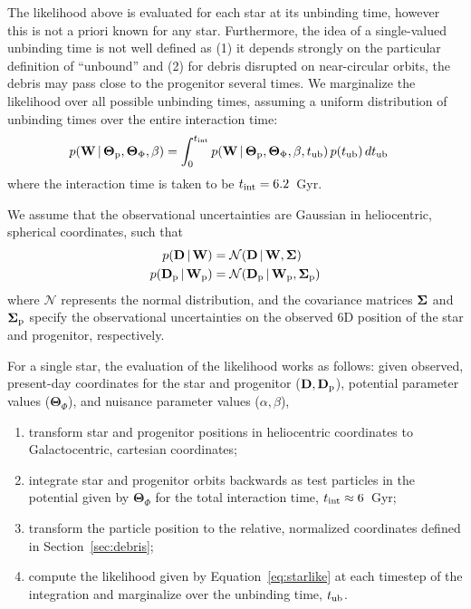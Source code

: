 \documentclass[letterpaper,12pt,preprint]{aastex}
\newcommand{\given}{\,|\,}
\newcommand{\D}{{\bf D}}
\newcommand{\W}{{\bf W}}
\newcommand{\bSigma}{{\bf \Sigma}}
\newcommand{\bs}{\boldsymbol}
\newcommand{\sat}{{\rm p}}
\newcommand{\tub}{t_{\rm ub}}
\newcommand{\tailbit}{\beta}
\newcommand{\Loffset}{\alpha}
\begin{document}
The likelihood above is evaluated for each star at its unbinding time, however this is not a priori known for any star. Furthermore, the idea of a single-valued unbinding time is not well defined as (1) it depends strongly on the particular definition of ``unbound'' and (2) for debris disrupted on near-circular orbits, the debris may pass close to the progenitor several times. We marginalize the likelihood over all possible unbinding times, assuming a uniform distribution of unbinding times over the entire interaction time:
\begin{align}
	p(\W \given \bs{\Theta}_\sat, \bs{\Theta}_\Phi, \tailbit) &= \int^{t_{\rm int}}_0 p(\W \given \bs{\Theta}_\sat, \bs{\Theta}_\Phi, \tailbit, \tub)\,p(\tub)\,d\tub
\end{align}
where the interaction time is taken to be $t_{\rm int}=6.2$~Gyr.

We assume that the observational uncertainties are Gaussian in heliocentric, spherical coordinates, such that
\begin{align}
	p(\D \given \W) &= \mathcal{N}(\D \given \W, \bSigma)\label{eq:obsstar}\\
	p(\D_\sat \given \W_\sat) &= \mathcal{N}(\D_\sat \given \W_\sat, \bSigma_\sat)\label{eq:obsprog}
\end{align}
where $\mathcal{N}$ represents the normal distribution, and the covariance matrices $\bSigma$ and $\bSigma_\sat$ specify the observational uncertainties on the observed 6D position of the star and progenitor, respectively. 

For a single star, the evaluation of the likelihood works as follows: given observed, present-day coordinates for the star and progenitor ($\D,\D_\sat$), potential parameter values ($\bs{\Theta}_\Phi$), and nuisance parameter values ($\Loffset,\tailbit$),
\begin{enumerate}
	\item transform star and progenitor positions in heliocentric coordinates to Galactocentric, cartesian coordinates;
	\item integrate star and progenitor orbits backwards as test particles in the potential given by $\bs{\Theta}_\Phi$ for the total interaction time, $t_{\rm int}\approx6$~Gyr;
	\item transform the particle position to the relative, normalized coordinates defined in Section~\ref{sec:debris};
	\item compute the likelihood given by Equation~\ref{eq:starlike} at each timestep of the integration and marginalize over the unbinding time, $\tub$.
\end{enumerate}
\end{document}
